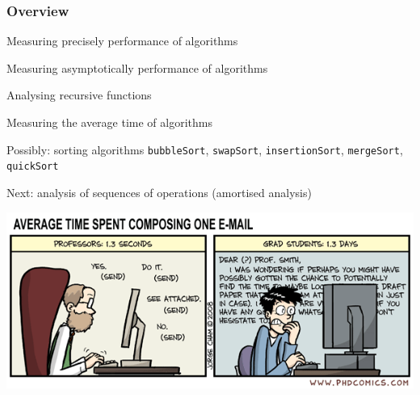 \documentclass[aspectratio=169]{beamer}
\begin{document}
\frame[plain]{\titlepage}


\begin{frame}[t]\frametitle{Overview}


  \begin{itemize}
    {\color{black!25}
    \item Measuring {precisely} performance of algorithms
    \item Measuring {asymptotically} performance of algorithms
    \item Analysing {recursive} functions}
    \item Measuring  the \alert{average time} of algorithms
    {\color{black!25}
    \item Possibly: sorting algorithms \texttt{bubbleSort}, \texttt{swapSort}, \texttt{insertionSort}, \texttt{mergeSort}, \texttt{quickSort}}
    \item Next: analysis of sequences of operations (\alert{amortised analysis})
  \end{itemize}
\end{frame}


\begin{frame}%
  \centering

  \includegraphics[width=\textwidth]{images/phd072508s}

\end{frame}
\end{document}
